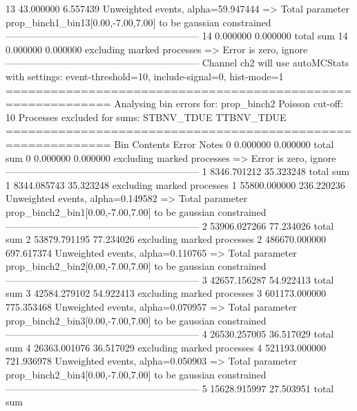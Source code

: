 13         43.000000       6.557439        Unweighted events, alpha=59.947444
  => Total parameter prop_binch1_bin13[0.00,-7.00,7.00] to be gaussian constrained
------------------------------------------------------------
14         0.000000        0.000000        total sum                     
14         0.000000        0.000000        excluding marked processes    
  => Error is zero, ignore      
------------------------------------------------------------
Channel ch2 will use autoMCStats with settings: event-threshold=10, include-signal=0, hist-mode=1
============================================================
Analysing bin errors for: prop_binch2
Poisson cut-off: 10
Processes excluded for sums: STBNV_TDUE TTBNV_TDUE
============================================================
Bin        Contents        Error           Notes                         
0          0.000000        0.000000        total sum                     
0          0.000000        0.000000        excluding marked processes    
  => Error is zero, ignore      
------------------------------------------------------------
1          8346.701212     35.323248       total sum                     
1          8344.085743     35.323248       excluding marked processes    
1          55800.000000    236.220236      Unweighted events, alpha=0.149582
  => Total parameter prop_binch2_bin1[0.00,-7.00,7.00] to be gaussian constrained
------------------------------------------------------------
2          53906.027266    77.234026       total sum                     
2          53879.791195    77.234026       excluding marked processes    
2          486670.000000   697.617374      Unweighted events, alpha=0.110765
  => Total parameter prop_binch2_bin2[0.00,-7.00,7.00] to be gaussian constrained
------------------------------------------------------------
3          42657.156287    54.922413       total sum                     
3          42584.279102    54.922413       excluding marked processes    
3          601173.000000   775.353468      Unweighted events, alpha=0.070957
  => Total parameter prop_binch2_bin3[0.00,-7.00,7.00] to be gaussian constrained
------------------------------------------------------------
4          26530.257005    36.517029       total sum                     
4          26363.001076    36.517029       excluding marked processes    
4          521193.000000   721.936978      Unweighted events, alpha=0.050903
  => Total parameter prop_binch2_bin4[0.00,-7.00,7.00] to be gaussian constrained
------------------------------------------------------------
5          15628.915997    27.503951       total sum                     
